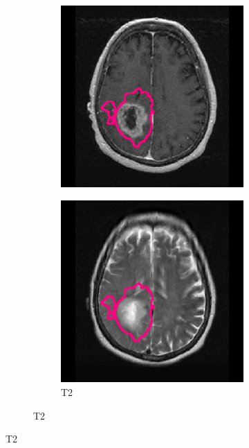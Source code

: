 \begin{subappendices}
\begin{figure}[htbp]
\begin{subfigure}[b]{0.95\textwidth}
\begin{subfigure}[b]{0.215\textwidth}
        \includegraphics[width=\textwidth, clip, trim=2.5cm 0.5cm 2.5cm 0.5cm]{Figures/Random_segs/T1GD_TCGA-02-0037.png}
        \end{subfigure}
        \hfill
        \begin{subfigure}[b]{0.215\textwidth}
        \caption*{\acrshort{T2}}
        \includegraphics[width=\textwidth, clip, trim=2.5cm 0.5cm 2.5cm 0.5cm]{Figures/Random_segs/T2_TCGA-02-0037.png}

\end{subfigure}
\end{subfigure}
\end{figure}
\end{subappendices}

